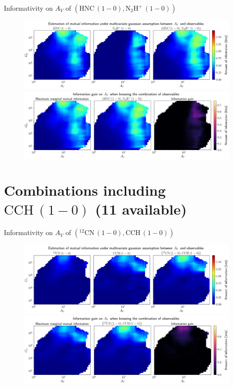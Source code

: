 \documentclass{beamer}
\begin{document}
\begin{frame}{Informativity on $A_V$ of $\left(\mathrm{HNC\,(1-0)},\mathrm{N_2H^+\,(1-0)}\right)$}
    \begin{figure}
        \centering
        \includegraphics[width=0.95\linewidth]{../linearinfo/av__hnc10_n2hp10_linearinfo.png}
        \vfill
        \includegraphics[width=0.95\linewidth]{../linearinfo/av__hnc10_n2hp10_linearinfo_gain.png}
    \end{figure}
\end{frame}

\section{Combinations including $\mathrm{CCH\,(1-0)}$ (11 available)}

\begin{frame}{Informativity on $A_V$ of $\left(\mathrm{^{12}CN\,(1-0)},\mathrm{CCH\,(1-0)}\right)$}
    \begin{figure}
        \centering
        \includegraphics[width=0.95\linewidth]{../linearinfo/av__12cn10_cch10_linearinfo.png}
        \vfill
        \includegraphics[width=0.95\linewidth]{../linearinfo/av__12cn10_cch10_linearinfo_gain.png}
    \end{figure}
\end{frame}
\end{document}

